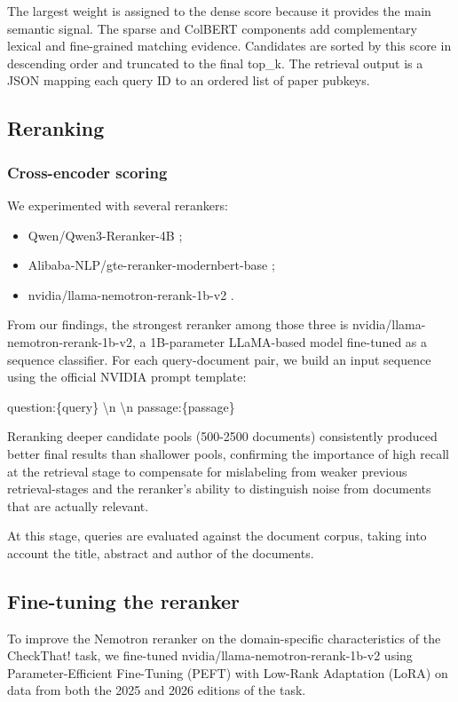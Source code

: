 The largest weight is assigned to the dense score because it provides the main semantic signal. The sparse and ColBERT components add complementary lexical and fine-grained matching evidence. Candidates are sorted by this score in descending order and truncated to the final top\_k. The retrieval output is a JSON mapping each query ID to an ordered list of paper pubkeys.


\subsection{Reranking} \label{sub:reranking}
\subsubsection{Cross-encoder scoring}
We experimented with several rerankers:
\begin{itemize}
    \item Qwen/Qwen3-Reranker-4B \cite{qwen3embedding};
    \item Alibaba-NLP/gte-reranker-modernbert-base \cite{zhang2024mgte, li2023towards};
    \item nvidia/llama-nemotron-rerank-1b-v2 \cite{llama-nemotron-rerank-1b-v2}.
\end{itemize}
 
From our findings, the strongest reranker among those three is nvidia/llama-nemotron-rerank-1b-v2, a 1B-parameter LLaMA-based model fine-tuned as a sequence classifier. For each query-document pair, we build an input sequence using the official NVIDIA prompt template:
\begin{promptbox}
    \small\ttfamily
    question:\{query\} \textbackslash n \textbackslash n passage:\{passage\}
\end{promptbox}

Reranking deeper candidate pools (500-2500 documents) consistently produced better final results than shallower pools, confirming the importance of high recall at the retrieval stage to compensate for mislabeling from weaker previous retrieval-stages and the reranker's ability to distinguish noise from documents that are actually relevant. 

At this stage, queries are evaluated against the document corpus, taking into account the title, abstract and author of the documents.

\subsection{Fine-tuning the reranker} \label{sub:finetuning}
To improve the Nemotron reranker on the domain-specific characteristics of the CheckThat! task, we fine-tuned nvidia/llama-nemotron-rerank-1b-v2 using Parameter-Efficient Fine-Tuning (PEFT) with Low-Rank Adaptation (LoRA) on data from both the 2025 and 2026 editions of the task.

